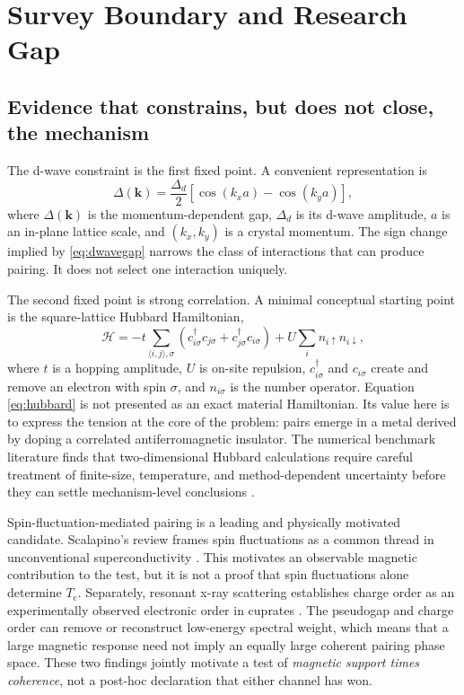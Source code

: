 \documentclass[conference]{IEEEtran}
\newcommand{\Tc}{\ensuremath{T_{\mathrm{c}}}}
\begin{document}
\section{Survey Boundary and Research Gap}

\subsection{Evidence that constrains, but does not close, the mechanism}

The d-wave constraint is the first fixed point. A convenient representation is
\begin{equation}
\Delta(\mathbf{k})=\frac{\Delta_d}{2}\left[\cos(k_xa)-\cos(k_ya)\right],
\label{eq:dwavegap}
\end{equation}
where $\Delta(\mathbf{k})$ is the momentum-dependent gap, $\Delta_d$ is its d-wave amplitude, $a$ is an in-plane lattice scale, and $(k_x,k_y)$ is a crystal momentum. The sign change implied by \eqref{eq:dwavegap} narrows the class of interactions that can produce pairing. It does not select one interaction uniquely.

The second fixed point is strong correlation. A minimal conceptual starting point is the square-lattice Hubbard Hamiltonian,
\begin{equation}
\mathcal{H}=-t\sum_{\langle i,j\rangle,\sigma}\left(c_{i\sigma}^{\dagger}c_{j\sigma}+c_{j\sigma}^{\dagger}c_{i\sigma}\right)+U\sum_i n_{i\uparrow}n_{i\downarrow},
\label{eq:hubbard}
\end{equation}
where $t$ is a hopping amplitude, $U$ is on-site repulsion, $c_{i\sigma}^{\dagger}$ and $c_{i\sigma}$ create and remove an electron with spin $\sigma$, and $n_{i\sigma}$ is the number operator. Equation \eqref{eq:hubbard} is not presented as an exact material Hamiltonian. Its value here is to express the tension at the core of the problem: pairs emerge in a metal derived by doping a correlated antiferromagnetic insulator. The numerical benchmark literature finds that two-dimensional Hubbard calculations require careful treatment of finite-size, temperature, and method-dependent uncertainty before they can settle mechanism-level conclusions \cite{leblanc2015}.

Spin-fluctuation-mediated pairing is a leading and physically motivated candidate. Scalapino's review frames spin fluctuations as a common thread in unconventional superconductivity \cite{scalapino2012}. This motivates an observable magnetic contribution to the test, but it is not a proof that spin fluctuations alone determine \Tc. Separately, resonant x-ray scattering establishes charge order as an experimentally observed electronic order in cuprates \cite{comin2016}. The pseudogap and charge order can remove or reconstruct low-energy spectral weight, which means that a large magnetic response need not imply an equally large coherent pairing phase space. These two findings jointly motivate a test of \emph{magnetic support times coherence}, not a post-hoc declaration that either channel has won.
\end{document}
